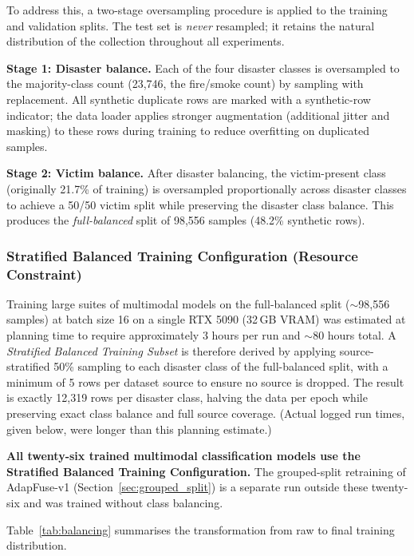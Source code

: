 To address this, a two-stage oversampling procedure is applied to the training and validation splits. The test set is \emph{never} resampled; it retains the natural distribution of the collection throughout all experiments.

\textbf{Stage 1: Disaster balance.} Each of the four disaster classes is oversampled to the majority-class count (23{,}746, the fire/smoke count) by sampling with replacement. All synthetic duplicate rows are marked with a synthetic-row indicator; the data loader applies stronger augmentation (additional jitter and masking) to these rows during training to reduce overfitting on duplicated samples.

\textbf{Stage 2: Victim balance.} After disaster balancing, the victim-present class (originally 21.7\% of training) is oversampled proportionally across disaster classes to achieve a 50/50 victim split while preserving the disaster class balance. This produces the \textit{full-balanced} split of 98{,}556 samples (48.2\% synthetic rows).

\subsubsection{Stratified Balanced Training Configuration (Resource Constraint)}

Training large suites of multimodal models on the full-balanced split ($\sim$98{,}556 samples) at batch size 16 on a single RTX 5090 (32\,GB VRAM) was estimated at planning time to require approximately 3 hours per run and $\sim$80 hours total. A \textit{Stratified Balanced Training Subset} is therefore derived by applying source-stratified 50\% sampling to each disaster class of the full-balanced split, with a minimum of 5 rows per dataset source to ensure no source is dropped. The result is exactly 12{,}319 rows per disaster class, halving the data per epoch while preserving exact class balance and full source coverage. (Actual logged run times, given below, were longer than this planning estimate.)

\textbf{All twenty-six trained multimodal classification models use the Stratified Balanced Training Configuration.} The grouped-split retraining of AdapFuse-v1 (Section~\ref{sec:grouped_split}) is a separate run outside these twenty-six and was trained without class balancing.

Table~\ref{tab:balancing} summarises the transformation from raw to final training distribution.

